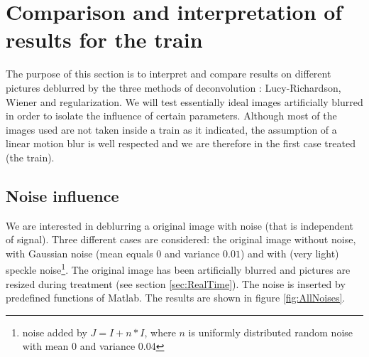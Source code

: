 \section{Comparison and interpretation of results for the train}

The purpose of this section is to interpret and compare results on different pictures deblurred by the three methods of deconvolution : Lucy-Richardson, Wiener and regularization. We will test essentially ideal images artificially blurred in order to isolate the influence of certain parameters. Although most of the images used are not taken inside a train as it indicated, the assumption of a linear motion blur is well respected and we are therefore in the first case treated (the train).

\subsection{Noise influence}

We are interested in deblurring a original image with noise (that is independent of signal). Three different cases are considered: the original image without noise, with Gaussian noise (mean equals $0$ and variance $0.01$) and with (very light) speckle noise\footnote{noise added by $J = I + n*I$, where $n$ is uniformly distributed random noise with mean 0 and variance 0.04\cite{mathWorksNoise}}. The original image has been artificially blurred and pictures are resized during treatment (see section \ref{sec:RealTime}). The noise is inserted by predefined functions of Matlab. The results are shown in figure \ref{fig:AllNoises}. 


